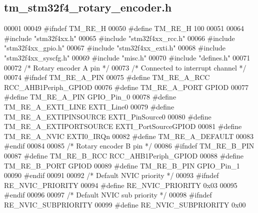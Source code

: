 \hypertarget{tm__stm32f4__rotary__encoder_8h_source}{}\subsection{tm\+\_\+stm32f4\+\_\+rotary\+\_\+encoder.\+h}

\begin{DoxyCode}
00001 
00049 \textcolor{preprocessor}{#ifndef TM\_RE\_H}
00050 \textcolor{preprocessor}{#define TM\_RE\_H 100}
00051 
00064 \textcolor{preprocessor}{#include "stm32f4xx.h"}
00065 \textcolor{preprocessor}{#include "stm32f4xx\_rcc.h"}
00066 \textcolor{preprocessor}{#include "stm32f4xx\_gpio.h"}
00067 \textcolor{preprocessor}{#include "stm32f4xx\_exti.h"}
00068 \textcolor{preprocessor}{#include "stm32f4xx\_syscfg.h"}
00069 \textcolor{preprocessor}{#include "misc.h"}
00070 \textcolor{preprocessor}{#include "defines.h"}
00071 
00072 \textcolor{comment}{/* Rotary encoder A pin */}
00073 \textcolor{comment}{/* Connected to interrupt channel */}
00074 \textcolor{preprocessor}{#ifndef TM\_RE\_A\_PIN}
00075 \textcolor{preprocessor}{#define TM\_RE\_A\_RCC                 RCC\_AHB1Periph\_GPIOD            }
00076 \textcolor{preprocessor}{#define TM\_RE\_A\_PORT                GPIOD}
00077 \textcolor{preprocessor}{#define TM\_RE\_A\_PIN                 GPIO\_Pin\_0}
00078 \textcolor{preprocessor}{#define TM\_RE\_A\_EXTI\_LINE           EXTI\_Line0}
00079 \textcolor{preprocessor}{#define TM\_RE\_A\_EXTIPINSOURCE       EXTI\_PinSource0}
00080 \textcolor{preprocessor}{#define TM\_RE\_A\_EXTIPORTSOURCE      EXTI\_PortSourceGPIOD}
00081 \textcolor{preprocessor}{#define TM\_RE\_A\_NVIC                EXTI0\_IRQn}
00082 \textcolor{preprocessor}{#define TM\_RE\_A\_DEFAULT}
00083 \textcolor{preprocessor}{#endif}
00084 
00085 \textcolor{comment}{/* Rotary encoder B pin */}
00086 \textcolor{preprocessor}{#ifndef TM\_RE\_B\_PIN}
00087 \textcolor{preprocessor}{#define TM\_RE\_B\_RCC                 RCC\_AHB1Periph\_GPIOD            }
00088 \textcolor{preprocessor}{#define TM\_RE\_B\_PORT                GPIOD}
00089 \textcolor{preprocessor}{#define TM\_RE\_B\_PIN                 GPIO\_Pin\_1}
00090 \textcolor{preprocessor}{#endif}
00091 
00092 \textcolor{comment}{/* Default NVIC priority */}
00093 \textcolor{preprocessor}{#ifndef RE\_NVIC\_PRIORITY}
00094 \textcolor{preprocessor}{#define RE\_NVIC\_PRIORITY            0x03}
00095 \textcolor{preprocessor}{#endif}
00096 
00097 \textcolor{comment}{/* Default NVIC sub priority */}
00098 \textcolor{preprocessor}{#ifndef RE\_NVIC\_SUBPRIORITY}
00099 \textcolor{preprocessor}{#define RE\_NVIC\_SUBPRIORITY         0x00}

\end{DoxyCode}
